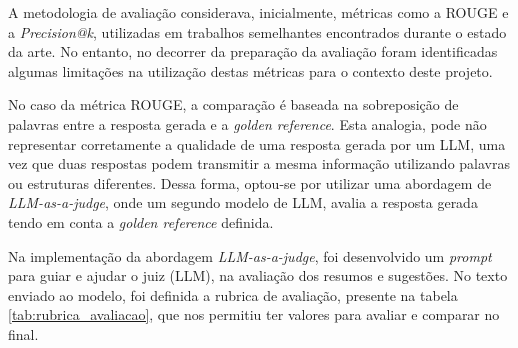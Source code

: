 	
	
	
	A metodologia de avaliação considerava, inicialmente, métricas como a \gls{ROUGE} e a \textit{Precision@k}, utilizadas em trabalhos semelhantes encontrados durante o estado da arte. No entanto, no decorrer da preparação da avaliação foram identificadas algumas limitações na utilização destas métricas para o contexto deste projeto.
	
	No caso da métrica \gls{ROUGE}, a comparação é baseada na sobreposição de palavras entre a resposta gerada e a \textit{golden reference}. Esta analogia, pode não representar corretamente a qualidade de uma resposta gerada por um \gls{LLM}, uma vez que duas respostas podem transmitir a mesma informação utilizando palavras ou estruturas diferentes. Dessa forma, optou-se por utilizar uma abordagem de \textit{LLM-as-a-judge}, onde um segundo modelo de \gls{LLM}, avalia a resposta gerada tendo em conta a \textit{golden reference} definida.
	
	Na implementação da abordagem \textit{LLM-as-a-judge}, foi desenvolvido um \textit{prompt} para guiar e ajudar o juiz (\gls{LLM}), na avaliação dos resumos e sugestões. No texto enviado ao modelo, foi definida a rubrica de avaliação, presente na tabela \ref{tab:rubrica_avaliacao}, que nos permitiu ter valores para avaliar e comparar no final.
	
